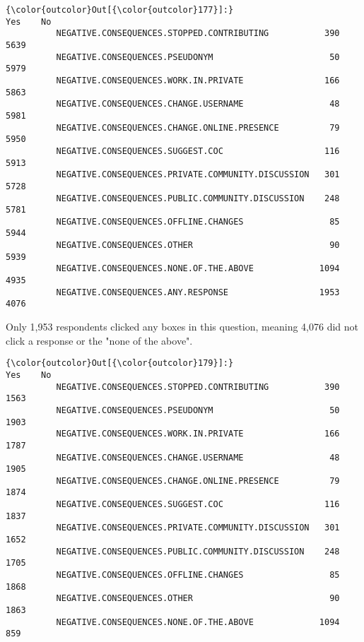 \documentclass[11pt]{article}
\begin{document}
            \begin{Verbatim}[commandchars=\\\{\}]
{\color{outcolor}Out[{\color{outcolor}177}]:}                                                      Yes    No
          NEGATIVE.CONSEQUENCES.STOPPED.CONTRIBUTING           390  5639
          NEGATIVE.CONSEQUENCES.PSEUDONYM                       50  5979
          NEGATIVE.CONSEQUENCES.WORK.IN.PRIVATE                166  5863
          NEGATIVE.CONSEQUENCES.CHANGE.USERNAME                 48  5981
          NEGATIVE.CONSEQUENCES.CHANGE.ONLINE.PRESENCE          79  5950
          NEGATIVE.CONSEQUENCES.SUGGEST.COC                    116  5913
          NEGATIVE.CONSEQUENCES.PRIVATE.COMMUNITY.DISCUSSION   301  5728
          NEGATIVE.CONSEQUENCES.PUBLIC.COMMUNITY.DISCUSSION    248  5781
          NEGATIVE.CONSEQUENCES.OFFLINE.CHANGES                 85  5944
          NEGATIVE.CONSEQUENCES.OTHER                           90  5939
          NEGATIVE.CONSEQUENCES.NONE.OF.THE.ABOVE             1094  4935
          NEGATIVE.CONSEQUENCES.ANY.RESPONSE                  1953  4076
\end{Verbatim}
        
    Only 1,953 respondents clicked any boxes in this question, meaning 4,076
did not click a response or the "none of the above".



            \begin{Verbatim}[commandchars=\\\{\}]
{\color{outcolor}Out[{\color{outcolor}179}]:}                                                      Yes    No
          NEGATIVE.CONSEQUENCES.STOPPED.CONTRIBUTING           390  1563
          NEGATIVE.CONSEQUENCES.PSEUDONYM                       50  1903
          NEGATIVE.CONSEQUENCES.WORK.IN.PRIVATE                166  1787
          NEGATIVE.CONSEQUENCES.CHANGE.USERNAME                 48  1905
          NEGATIVE.CONSEQUENCES.CHANGE.ONLINE.PRESENCE          79  1874
          NEGATIVE.CONSEQUENCES.SUGGEST.COC                    116  1837
          NEGATIVE.CONSEQUENCES.PRIVATE.COMMUNITY.DISCUSSION   301  1652
          NEGATIVE.CONSEQUENCES.PUBLIC.COMMUNITY.DISCUSSION    248  1705
          NEGATIVE.CONSEQUENCES.OFFLINE.CHANGES                 85  1868
          NEGATIVE.CONSEQUENCES.OTHER                           90  1863
          NEGATIVE.CONSEQUENCES.NONE.OF.THE.ABOVE             1094   859
\end{Verbatim}
        
\end{document}
